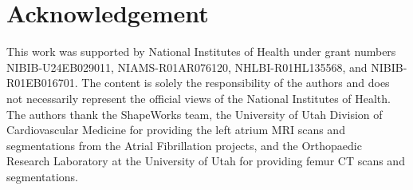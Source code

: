 \section{Acknowledgement}
This work was supported by National Institutes of Health under grant numbers NIBIB-U24EB029011, NIAMS-R01AR076120, NHLBI-R01HL135568, and NIBIB- R01EB016701. The content is solely the responsibility of the authors and does not necessarily represent the official views of the National Institutes of Health. The authors thank the ShapeWorks team, the University of Utah Division of Cardiovascular Medicine for providing the left atrium MRI scans and segmentations from the Atrial Fibrillation projects, and the Orthopaedic Research Laboratory at the University of Utah for providing femur CT scans and segmentations.